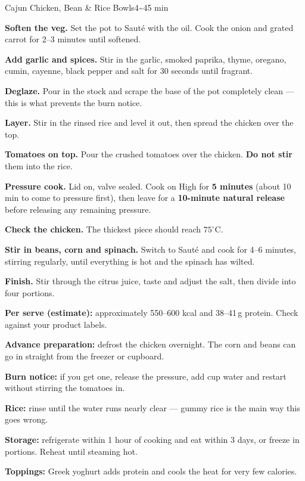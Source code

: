 \begin{recipebox}{Cajun Chicken, Bean \& Rice Bowls}{4}{\textasciitilde45 min}
\begin{method}
  \item \textbf{Soften the veg.} Set the pot to Saut\'e with the oil. Cook the
        onion and grated carrot for 2--3 minutes until softened.
  \item \textbf{Add garlic and spices.} Stir in the garlic, smoked paprika,
        thyme, oregano, cumin, cayenne, black pepper and salt for 30 seconds
        until fragrant.
  \item \textbf{Deglaze.} Pour in the stock and scrape the base of the pot
        completely clean --- this is what prevents the burn notice.
  \item \textbf{Layer.} Stir in the rinsed rice and level it out, then spread
        the chicken over the top.
  \item \textbf{Tomatoes on top.} Pour the crushed tomatoes over the chicken.
        \textbf{Do not stir} them into the rice.
  \item \textbf{Pressure cook.} Lid on, valve sealed. Cook on High for
        \textbf{5 minutes} (about 10 min to come to pressure first), then
        leave for a \textbf{10-minute natural release} before releasing any
        remaining pressure.
  \item \textbf{Check the chicken.} The thickest piece should reach
        $75^{\circ}$C.
  \item \textbf{Stir in beans, corn and spinach.} Switch to Saut\'e and cook
        for 4--6 minutes, stirring regularly, until everything is hot and the
        spinach has wilted.
  \item \textbf{Finish.} Stir through the citrus juice, taste and adjust the
        salt, then divide into four portions.
\end{method}

\begin{notelist}
  \item \textbf{Per serve (estimate):} approximately 550--600 kcal and 38--41\,g protein. Check against your product labels.
  \item \textbf{Advance preparation:} defrost the chicken overnight. The corn and beans can go in straight from the freezer or cupboard.
  \item \textbf{Burn notice:} if you get one, release the pressure, add  cup water and restart without stirring the tomatoes in.
  \item \textbf{Rice:} rinse until the water runs nearly clear --- gummy rice is the main way this goes wrong.
  \item \textbf{Storage:} refrigerate within 1 hour of cooking and eat within 3 days, or freeze in portions. Reheat until steaming hot.
  \item \textbf{Toppings:} Greek yoghurt adds protein and cools the heat for very few calories.
\end{notelist}


\end{recipebox}
